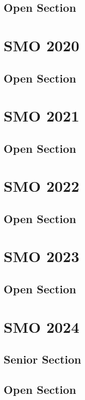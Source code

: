 \documentclass[a4paper,listof=totoc,bibliography=totoc,openany]{scrbook}
\begin{document}
\section{Open Section}




\chapter{SMO 2020}
\section{Open Section}


\chapter{SMO 2021}
\section{Open Section}


\chapter{SMO 2022}
\section{Open Section}



\chapter{SMO 2023}
\section{Open Section}



\chapter{SMO 2024}
\section{Senior Section}


\section{Open Section}


\end{document}
